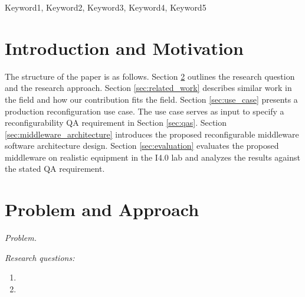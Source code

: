 \documentclass[conference]{IEEEtran}
\begin{document}
\maketitle
\IEEEpubidadjcol
\begin{abstract}





\end{abstract}

\begin{IEEEkeywords}
    Keyword1, Keyword2, Keyword3, Keyword4, Keyword5
\end{IEEEkeywords}

\section{Introduction and Motivation}






The structure of the paper is as follows.
Section \ref{sec:problem} outlines the research question and the research approach.
Section \ref{sec:related_work} describes similar work in the field and how our contribution fits the field.
Section \ref{sec:use_case} presents a production reconfiguration use case.
The use case serves as input to specify a reconfigurability QA requirement in Section \ref{sec:qas}.
Section \ref{sec:middleware_architecture} introduces the proposed reconfigurable middleware software architecture design.
Section \ref{sec:evaluation} evaluates the proposed middleware on realistic equipment in the I4.0 lab and analyzes the results against the stated QA requirement.

\section{Problem and Approach}

\label{sec:problem}
\emph{Problem.}


\emph{Research questions:}
\begin{enumerate}
    \item
    \item
\end{enumerate}
\end{document}

